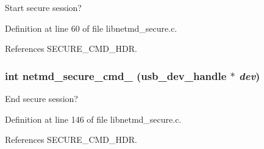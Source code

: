 Start secure session? 

Definition at line 60 of file libnetmd\_\-secure.c.

References SECURE\_\-CMD\_\-HDR.
\subsubsection[{netmd\_\-secure\_\-cmd\_\-81}]{\setlength{\rightskip}{0pt plus 5cm}int netmd\_\-secure\_\-cmd\_ (usb\_\-dev\_\-handle $\ast$ {\em dev})}\label{libnetmd__secure_8c_aa376f60375a7acff25d2fd8f50ac6881}


End secure session? 

Definition at line 146 of file libnetmd\_\-secure.c.

References SECURE\_\-CMD\_\-HDR.